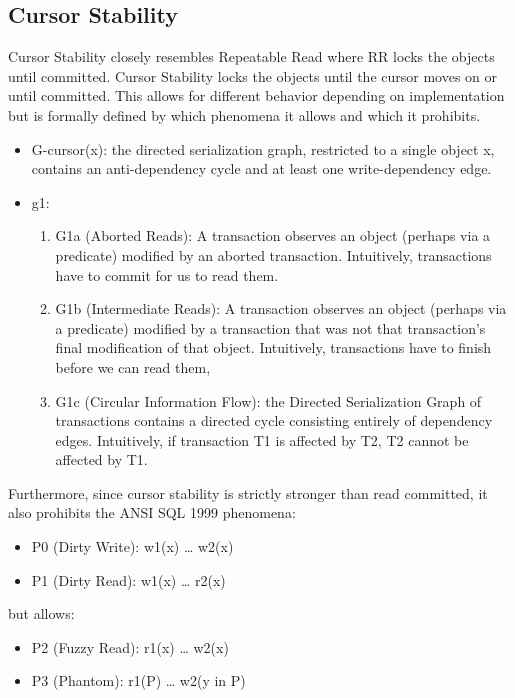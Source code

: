 \documentclass[a4paper,10pt,titlepage]{report}
\begin{document}
\newpage
\subsection{Cursor Stability}
Cursor Stability closely resembles Repeatable Read where RR locks the objects until committed. Cursor Stability locks the objects until the cursor moves on or until committed. This allows for different behavior depending on implementation but is formally defined by which phenomena it allows and which it prohibits. \cite{Adya99weakconsistency}\\
\begin{itemize}
    \item G-cursor(x): the directed serialization graph, restricted to a single object x, contains an anti-dependency cycle and at least one write-dependency edge.
    \item g1:
    \begin{enumerate}
        \item G1a (Aborted Reads): A transaction observes an object (perhaps via a predicate) modified by an aborted transaction. Intuitively, transactions have to commit for us to read them.
        \item G1b (Intermediate Reads): A transaction observes an object (perhaps via a predicate) modified by a transaction that was not that transaction's final modification of that object. Intuitively, transactions have to finish before we can read them,
        \item G1c (Circular Information Flow): the Directed Serialization Graph of transactions contains a directed cycle consisting entirely of dependency edges. Intuitively, if transaction T1 is affected by T2, T2 cannot be affected by T1.
    \end{enumerate}
\end{itemize}
Furthermore, since cursor stability is strictly stronger than read committed, it also prohibits the ANSI SQL 1999\cite{ansisql1999} phenomena:
\begin{itemize}
    \item P0 (Dirty Write): w1(x) … w2(x)
    \item P1 (Dirty Read): w1(x) … r2(x)
\end{itemize}

but allows:
\begin{itemize}
    \item P2 (Fuzzy Read): r1(x) … w2(x)
    \item P3 (Phantom): r1(P) … w2(y in P)
\end{itemize}
\end{document}
